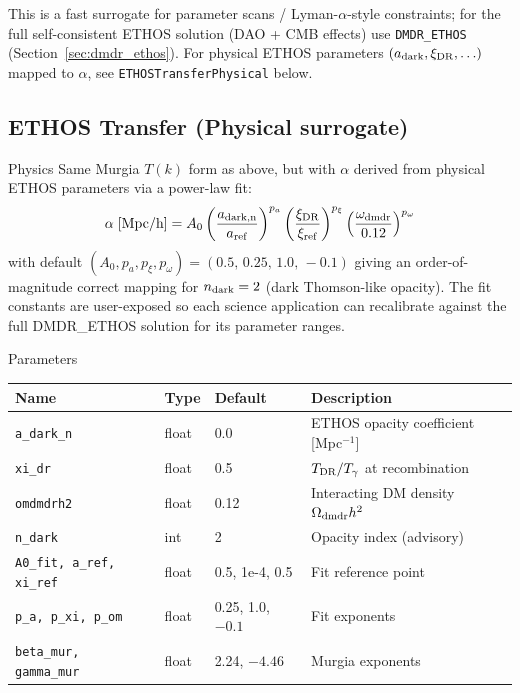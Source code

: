 \documentclass[11pt,a4paper]{article}
\begin{document}
\begin{notebox}
This is a fast surrogate for parameter scans / Lyman-$\alpha$-style constraints; for the full self-consistent ETHOS solution (DAO + CMB effects) use \texttt{DMDR\_ETHOS} (Section~\ref{sec:dmdr_ethos}). For physical ETHOS parameters $(a_{\rm dark}, \xi_{\rm DR}, \ldots)$ mapped to $\alpha$, see \texttt{ETHOSTransferPhysical} below.
\end{notebox}


\newpage
\subsection{ETHOS Transfer (Physical surrogate)}
\label{sec:ethos_physical}

\begin{physbox}{Physics}
Same Murgia $T(k)$ form as above, but with $\alpha$ derived from physical ETHOS parameters via a power-law fit:
\begin{equation}
    \alpha\;[\text{Mpc/h}] = A_0 \left(\frac{a_{\rm dark,n}}{a_{\rm ref}}\right)^{p_a}
        \left(\frac{\xi_{\rm DR}}{\xi_{\rm ref}}\right)^{p_\xi}
        \left(\frac{\omega_{\rm dmdr}}{0.12}\right)^{p_\omega}
\end{equation}
with default $(A_0, p_a, p_\xi, p_\omega) = (0.5,\,0.25,\,1.0,\,-0.1)$ giving an order-of-magnitude correct mapping for $n_{\rm dark}=2$ (dark Thomson-like opacity). The fit constants are user-exposed so each science application can recalibrate against the full DMDR\_ETHOS solution for its parameter ranges.
\end{physbox}

\begin{parambox}{Parameters}
\begin{tabular}{llll}
\toprule
Name & Type & Default & Description \\
\midrule
\texttt{a\_dark\_n} & float & 0.0 & ETHOS opacity coefficient [Mpc$^{-1}$] \\
\texttt{xi\_dr} & float & 0.5 & $T_{\rm DR}/T_\gamma$ at recombination \\
\texttt{omdmdrh2} & float & 0.12 & Interacting DM density $\Omega_{\rm dmdr} h^2$ \\
\texttt{n\_dark} & int & 2 & Opacity index (advisory) \\
\texttt{A0\_fit, a\_ref, xi\_ref} & float & 0.5, 1e-4, 0.5 & Fit reference point \\
\texttt{p\_a, p\_xi, p\_om} & float & 0.25, 1.0, $-0.1$ & Fit exponents \\
\texttt{beta\_mur, gamma\_mur} & float & 2.24, $-4.46$ & Murgia exponents \\
\bottomrule
\end{tabular}
\end{parambox}
\end{document}
